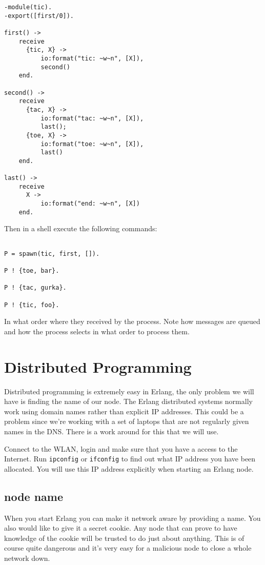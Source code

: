 \documentclass[a4paper, 11pt]{article}
\begin{document}
\begin{verbatim}
-module(tic).
-export([first/0]).

first() ->
    receive
      {tic, X} -> 
          io:format("tic: ~w~n", [X]),
          second()
    end.

second() ->
    receive
      {tac, X} -> 
          io:format("tac: ~w~n", [X]),
          last();
      {toe, X} -> 
          io:format("toe: ~w~n", [X]),
          last()
    end.

last() ->
    receive 
      X ->
          io:format("end: ~w~n", [X])
    end.
\end{verbatim}


\noindent Then in a shell execute the following commands:

\begin{verbatim}

P = spawn(tic, first, []).

P ! {toe, bar}.

P ! {tac, gurka}.

P ! {tic, foo}.

\end{verbatim}

\noindent In what order where they received by the process. Note how messages
are queued and how the process selects in what order to process them.


\section{Distributed Programming}

Distributed programming is extremely easy in Erlang, the only problem
we will have is finding the name of our node. The Erlang distributed
systems normally work using domain names rather than explicit IP
addresses. This could be a problem since we're working with a set of
laptops that are not regularly given names in the DNS. There is a work
around for this that we will use.

Connect to the WLAN, login and make sure that you have a access to the
Internet. Run {\tt ipconfig} or {\tt ifconfig} to find out what IP address
you have been allocated. You will use this IP address explicitly when 
starting an Erlang node.

\subsection{node name}

When you start Erlang you can make it network aware by providing a
name. You also would like to give it a secret cookie. Any node that
can prove to have knowledge of the cookie will be trusted to do just
about anything. This is of course quite dangerous and it's very easy
for a malicious node to close a whole network down.
\end{document}
